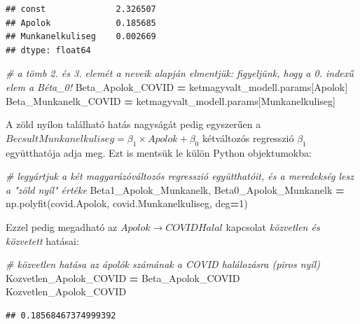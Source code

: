 \documentclass[
]{book}
\newenvironment{Shaded}{\begin{snugshade}}{\end{snugshade}}
\newcommand{\CommentTok}[1]{\textcolor[rgb]{0.56,0.35,0.01}{\textit{#1}}}
\newcommand{\DecValTok}[1]{\textcolor[rgb]{0.00,0.00,0.81}{#1}}
\newcommand{\NormalTok}[1]{#1}
\newcommand{\OperatorTok}[1]{\textcolor[rgb]{0.81,0.36,0.00}{\textbf{#1}}}
\newcommand{\StringTok}[1]{\textcolor[rgb]{0.31,0.60,0.02}{#1}}
\begin{document}
\begin{verbatim}
## const              2.326507
## Apolok             0.185685
## Munkanelkuliseg    0.002669
## dtype: float64
\end{verbatim}

\begin{Shaded}
\begin{Highlighting}[]

\CommentTok{\# a tömb 2. és 3. elemét a neveik alapján elmentjük: figyeljünk, hogy a 0. indexű elem a Béta\_0!}
\NormalTok{Beta\_Apolok\_COVID }\OperatorTok{=}\NormalTok{ ketmagyvalt\_modell.params[}\StringTok{\textquotesingle{}Apolok\textquotesingle{}}\NormalTok{]}
\NormalTok{Beta\_Munkanelk\_COVID }\OperatorTok{=}\NormalTok{ ketmagyvalt\_modell.params[}\StringTok{\textquotesingle{}Munkanelkuliseg\textquotesingle{}}\NormalTok{]}
\end{Highlighting}
\end{Shaded}

A zöld nyílon található hatás nagyságát pedig egyszerűen a \(BecsultMunkanelkuliseg = \beta_1 \times Apolok + \beta_0\) kétváltozós regresszió \(\beta_1\) együtthatója adja meg. Ezt is mentsük le külön Python objektumokba:

\begin{Shaded}
\begin{Highlighting}[]
\CommentTok{\# legyártjuk a két magyarázóváltozós regresszió együtthatóit, és a meredekség lesz a "zöld nyíl" értéke}
\NormalTok{Beta1\_Apolok\_Munkanelk, Beta0\_Apolok\_Munkanelk }\OperatorTok{=}\NormalTok{ np.polyfit(covid.Apolok, covid.Munkanelkuliseg, deg}\OperatorTok{=}\DecValTok{1}\NormalTok{)}
\end{Highlighting}
\end{Shaded}

Ezzel pedig megadható az \(Apolok \rightarrow COVIDHalal\) kapcsolat \emph{közvetlen és közvetett} hatásai:

\begin{Shaded}
\begin{Highlighting}[]
\CommentTok{\# közvetlen hatása az ápolók számának a COVID halálozásra (piros nyíl)}
\NormalTok{Kozvetlen\_Apolok\_COVID }\OperatorTok{=}\NormalTok{ Beta\_Apolok\_COVID}
\NormalTok{Kozvetlen\_Apolok\_COVID}
\end{Highlighting}
\end{Shaded}

\begin{verbatim}
## 0.18568467374999392
\end{verbatim}
\end{document}
